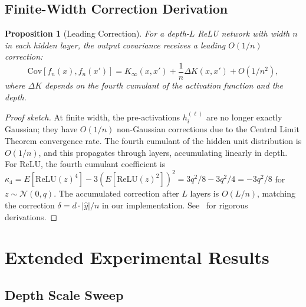 \documentclass[10pt]{article}
\newtheorem{proposition}[theorem]{Proposition}
\theoremstyle{definition}
\begin{document}
\subsection{Finite-Width Correction Derivation}
\label{app:proof-finite-width}

\begin{proposition}[Leading Correction]
For a depth-$L$ ReLU network with width $n$ in each hidden layer, the output covariance receives a leading $O(1/n)$ correction:
\begin{equation}
  \text{Cov}[f_n(x), f_n(x')] = K_\infty(x, x') + \frac{1}{n} \Delta K(x, x') + O(1/n^2),
\end{equation}
where $\Delta K$ depends on the fourth cumulant of the activation function and the depth.
\end{proposition}

\begin{proof}[Proof sketch]
At finite width, the pre-activations $h_i^{(\ell)}$ are no longer exactly Gaussian; they have $O(1/n)$ non-Gaussian corrections due to the Central Limit Theorem convergence rate.
The fourth cumulant of the hidden unit distribution is $O(1/n)$, and this propagates through layers, accumulating linearly in depth.
For ReLU, the fourth cumulant coefficient is $\kappa_4 = E[\text{ReLU}(z)^4] - 3(E[\text{ReLU}(z)^2])^2 = 3q^2/8 - 3q^2/4 = -3q^2/8$ for $z \sim \mathcal{N}(0,q)$.
The accumulated correction after $L$ layers is $O(L/n)$, matching the correction $\delta = d \cdot |\hat{y}| / n$ in our implementation.
See~\citet{dyer2020asymptotics,hanin2020finite} for rigorous derivations.
\end{proof}

\section{Extended Experimental Results}
\label{app:extended}

\subsection{Depth Scale Sweep}
\end{document}
